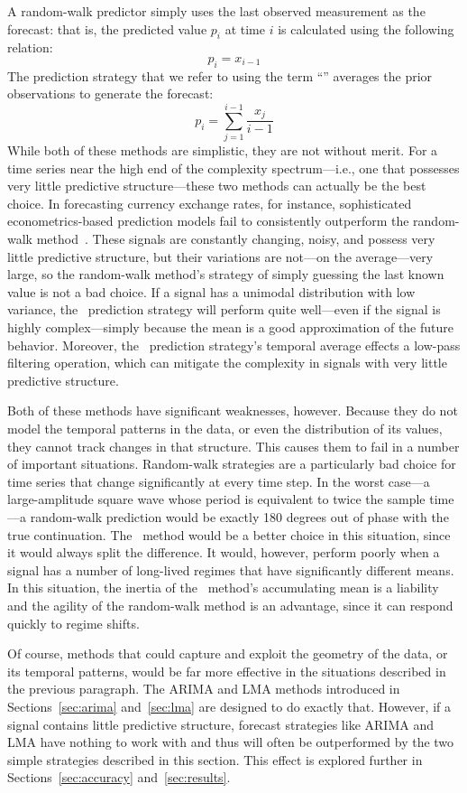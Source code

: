 A random-walk predictor simply uses the last observed measurement as
the forecast: that is, the predicted value $p_i$ at time $i$ is
calculated using the following relation: $$p_i = x_{i-1}$$ The
prediction strategy that we refer to using the term ``\naive''
averages the prior observations to generate the forecast: $$p_i =
\sum_{j=1}^{i-1}\frac{x_j}{i-1}$$ While both of these methods are
simplistic, they are not without merit.  For a time series near the
high end of the complexity spectrum---i.e., one that possesses very
little predictive structure---these two methods can actually be the
best choice.  In forecasting currency exchange rates, for instance,
sophisticated econometrics-based prediction models fail to
consistently outperform the random-walk method~\cite{rwMeese,rwCCE}.
These signals are constantly changing, noisy, and possess very little
predictive structure, but their variations are not---on the
average---very large, so the random-walk method's strategy of simply
guessing the last known value is not a bad choice.  If a signal has a
unimodal distribution with low variance, the \naive ~prediction
strategy will perform quite well---even if the signal is highly
complex---simply because the mean is a good approximation of the
future behavior.  Moreover, the \naive ~prediction strategy's temporal
average effects a low-pass filtering operation, which can  mitigate the
complexity in signals with very little predictive structure.

Both of these methods have significant weaknesses, however.  Because
they do not model the temporal patterns in the data, or even the
distribution of its values, they cannot track changes in that
structure.  This causes them to fail in a number of important
situations.  Random-walk strategies are a particularly bad choice for
time series that change significantly at every time step.  In the
worst case---a large-amplitude square wave whose period is equivalent
to twice the sample time---a random-walk prediction would be exactly
180 degrees out of phase with the true continuation.  The \naive
~method would be a better choice in this situation, since it would
always split the difference.  It would, however, perform poorly when a
signal has a number of long-lived regimes that have significantly
different means.  In this situation, the inertia of the \naive
~method's accumulating mean is a liability and the agility of the
random-walk method is an advantage, since it can respond quickly to
regime shifts.

Of course, methods that could capture and exploit the geometry of the
data, or its temporal patterns, would be far more effective in the
situations described in the previous paragraph.  The ARIMA and LMA
methods introduced in Sections~\ref{sec:arima} and~\ref{sec:lma} are
designed to do exactly that. 
However, if a signal contains little predictive structure, forecast
strategies like ARIMA and LMA have nothing to work with and thus will
often be outperformed by the two simple strategies described in this
section.  This effect is explored further in Sections~\ref{sec:accuracy}
and~\ref{sec:results}.


